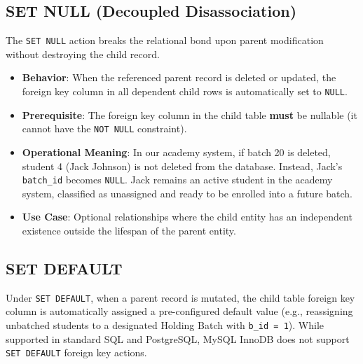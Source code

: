 \documentclass[10pt,journal,compsoc,onecolumn]{IEEEtran}
\begin{document}
\subsection{SET NULL (Decoupled Disassociation)}
The \texttt{SET NULL} action breaks the relational bond upon parent modification without destroying the child record.

\begin{itemize}
    \item \textbf{Behavior}: When the referenced parent record is deleted or updated, the foreign key column in all dependent child rows is automatically set to \texttt{NULL}.
    \item \textbf{Prerequisite}: The foreign key column in the child table \textbf{must} be nullable (it cannot have the \texttt{NOT NULL} constraint).
    \item \textbf{Operational Meaning}: In our academy system, if batch 20 is deleted, student 4 (Jack Johnson) is not deleted from the database. Instead, Jack's \texttt{batch\_id} becomes \texttt{NULL}. Jack remains an active student in the academy system, classified as unassigned and ready to be enrolled into a future batch.
    \item \textbf{Use Case}: Optional relationships where the child entity has an independent existence outside the lifespan of the parent entity.
\end{itemize}

\subsection{SET DEFAULT}
Under \texttt{SET DEFAULT}, when a parent record is mutated, the child table foreign key column is automatically assigned a pre-configured default value (e.g., reassigning unbatched students to a designated Holding Batch with \texttt{b\_id = 1}). While supported in standard SQL and PostgreSQL, MySQL InnoDB does not support \texttt{SET DEFAULT} foreign key actions.
\end{document}
